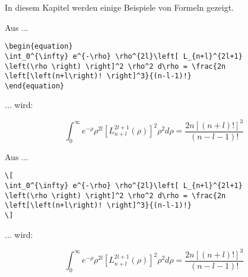 In diesem Kapitel werden einige Beispiele von Formeln gezeigt.

\par\bigskip 
\par\bigskip 
\par\bigskip 
Aus ...

\begin{tcolorbox}[width=\textwidth,colback={light-gray},title={Latex-Text},colbacktitle=gray,coltitle=white]

\begin{verbatim}
\begin{equation} 
\int_0^{\infty} e^{-\rho} \rho^{2l}\left[ L_{n+l}^{2l+1} 
\left(\rho \right) \right]^2 \rho^2 d\rho = \frac{2n 
\left[\left(n+l\right)! \right]^3}{(n-l-1)!} 
\end{equation} 
\end{verbatim}

\end{tcolorbox}

... wird: 

\begin{tcolorbox}[width=\textwidth,colback={light-gray},title={Print-Text},colbacktitle=gray,coltitle=white]
\begin{equation} 
\int_0^{\infty} e^{-\rho} \rho^{2l}\left[ L_{n+l}^{2l+1} 
\left(\rho \right) \right]^2 \rho^2 d\rho = \frac{2n 
\left[\left(n+l\right)! \right]^3}{(n-l-1)!} 
\end{equation} 

\end{tcolorbox}

\par\bigskip 
\par\bigskip 
\par\bigskip 
Aus ...

\begin{tcolorbox}[width=\textwidth,colback={light-gray},title={Latex-Text},colbacktitle=gray,coltitle=white]

\begin{verbatim}
\[ 
\int_0^{\infty} e^{-\rho} \rho^{2l}\left[ L_{n+l}^{2l+1} 
\left(\rho \right) \right]^2 \rho^2 d\rho = \frac{2n 
\left[\left(n+l\right)! \right]^3}{(n-l-1)!} 
\] 
\end{verbatim}

\end{tcolorbox}

... wird: 

\begin{tcolorbox}[width=\textwidth,colback={light-gray},title={Print-Text},colbacktitle=gray,coltitle=white]
\[ 
\int_0^{\infty} e^{-\rho} \rho^{2l}\left[ L_{n+l}^{2l+1} 
\left(\rho \right) \right]^2 \rho^2 d\rho = \frac{2n 
\left[\left(n+l\right)! \right]^3}{(n-l-1)!} 
\]

\end{tcolorbox}
